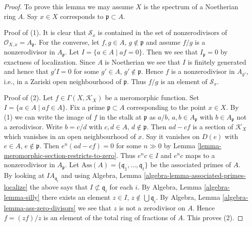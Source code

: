 \begin{proof}
To prove this lemma we may assume $X$ is the spectrum of a Noetherian
ring $A$. Say $x \in X$ corresponds to $\mathfrak p \subset A$.

\medskip\noindent
Proof of (1). It is clear that $\mathcal{S}_x$ is contained
in the set of nonzerodivisors of $\mathcal{O}_{X, x} = A_\mathfrak p$.
For the converse, let $f, g \in A$, $g \not \in \mathfrak p$ and
assume $f/g$ is a nonzerodivisor in $A_{\mathfrak p}$. Let
$I = \{a \in A \mid af = 0\}$. Then we see that $I_{\mathfrak p} = 0$ by
exactness of localization. Since $A$ is Noetherian we see that $I$
is finitely generated and hence that $g'I = 0$ for some $g' \in A$,
$g' \not \in \mathfrak p$. Hence $f$ is a nonzerodivisor
in $A_{g'}$, i.e., in a Zariski open neighbourhood of $\mathfrak p$.
Thus $f/g$ is an element of $\mathcal{S}_x$.

\medskip\noindent
Proof of (2). Let $f \in \Gamma(X, \mathcal{K}_X)$ be a meromorphic function.
Set $I = \{a \in A \mid af \in A\}$. Fix a prime $\mathfrak p \subset A$
corresponding to the point $x \in X$. By (1) we can write the image of $f$
in the stalk at $\mathfrak p$ as $a/b$, $a, b \in A_{\mathfrak p}$ with
$b \in A_{\mathfrak p}$ not a zerodivisor. Write $b = c/d$ with
$c, d \in A$, $d \not \in \mathfrak p$. Then $ad - cf$ is a section of
$\mathcal{K}_X$ which vanishes in an open neighbourhood of $x$. Say it
vanishes on $D(e)$ with $e \in A$, $e \not \in \mathfrak p$. Then
$e^n(ad - cf) = 0$ for some $n \gg 0$ by
Lemma \ref{lemma-meromorphic-section-restricts-to-zero}.
Thus $e^nc \in I$ and $e^nc$ maps to a nonzerodivisor in
$A_{\mathfrak p}$. Let
$\text{Ass}(A) = \{\mathfrak q_1, \ldots, \mathfrak q_t\}$ be the
associated primes of $A$. By looking at $IA_{\mathfrak q_i}$ and
using Algebra, Lemma \ref{algebra-lemma-associated-primes-localize}
the above says that
$I \not \subset \mathfrak q_i$ for each $i$. By
Algebra, Lemma \ref{algebra-lemma-silly}
there exists an element $z \in I$, $z \not \in \bigcup \mathfrak q_i$.
By Algebra, Lemma \ref{algebra-lemma-ass-zero-divisors}
we see that $z$ is not a zerodivisor on $A$.
Hence $f = (zf)/z$ is an element of the total ring of fractions of $A$.
This proves (2).
\end{proof}

